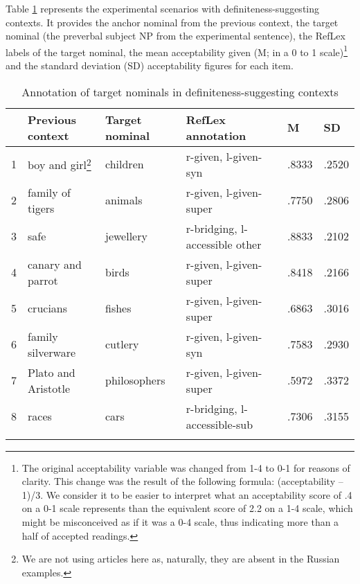 \documentclass[output=paper]{langsci/langscibook}
\begin{document}
Table \ref{2table:1} represents the experimental scenarios with definiteness-suggesting contexts. It provides the anchor nominal from the previous context, the target nominal (the preverbal subject NP from the experimental sentence), the RefLex labels of the target nominal, the mean acceptability given (M; in a 0 to 1 scale)\footnote{The original acceptability variable was changed from 1-4 to 0-1 for reasons of clarity. This change was the result of the following formula: (acceptability -- 1)/3. We consider it to be easier to interpret what an acceptability score of .4 on a 0-1 scale represents than the equivalent score of 2.2 on a 1-4 scale, which might be misconceived as if it was a 0-4 scale, thus indicating more than a half of accepted readings.} and the standard deviation (SD) acceptability figures for each item.

\begin{table}[H]

{
{\small{
\begin{tabular}{m{1pt}llm{112pt}m{17pt}m{18pt}}
\lsptoprule
 & {\bf{Previous context}} & {\bf{Target nominal}} & {\bf{RefLex annotation}} & {\bf{M}} & {\bf{SD}} \\
 \midrule
1 & boy and girl\footnote{We are not using articles here as, naturally, they are absent in the Russian examples.}  & children & r-given, l-given-syn & .8333 & .2520 \\ 
2 & family of tigers & animals & r-given, l-given-super & .7750 & .2806 \\ %
3 & safe & jewellery & r-bridging, l-accessible other & .8833 & .2102 \\ %
4 & canary and parrot & birds & r-given, l-given-super & .8418 & .2166 \\ %
5 & crucians & fishes & r-given, l-given-super & .6863 & .3016 \\ %
6 & family silverware & cutlery & r-given, l-given-syn & .7583 & .2930 \\ %
7 & Plato and Aristotle & philosophers & r-given, l-given-super & .5972 & .3372 \\ %
8 & races & cars & r-bridging, l-accessible-sub & .7306 & .3155 \\ %
\lspbottomrule
\end{tabular}
}}
}
\caption{{Annotation of target nominals in definiteness-suggesting contexts}}\label{2table:1}
\end{table}
\vspace*{-3mm}
\end{document}
